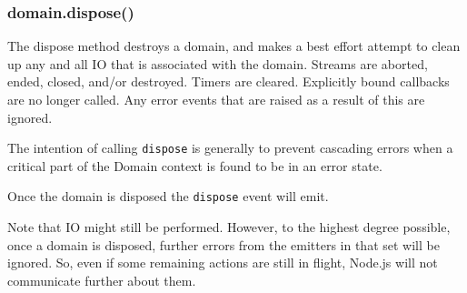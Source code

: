 \subsubsection{domain.dispose()}

The dispose method destroys a domain, and makes a best effort attempt to
clean up any and all IO that is associated with the domain. Streams are
aborted, ended, closed, and/or destroyed. Timers are cleared. Explicitly
bound callbacks are no longer called. Any error events that are raised
as a result of this are ignored.

The intention of calling \texttt{dispose} is generally to prevent
cascading errors when a critical part of the Domain context is found to
be in an error state.

Once the domain is disposed the \texttt{dispose} event will emit.

Note that IO might still be performed. However, to the highest degree
possible, once a domain is disposed, further errors from the emitters in
that set will be ignored. So, even if some remaining actions are still
in flight, Node.js will not communicate further about them.
